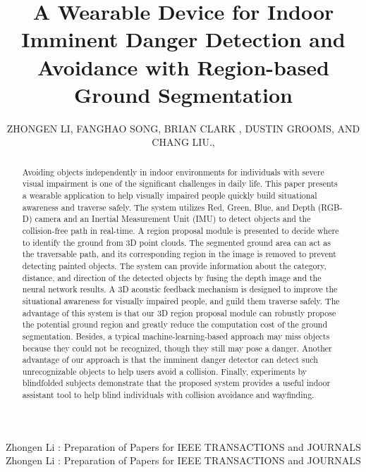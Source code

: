 \documentclass{ieeeaccess}
\begin{document}


\title{A Wearable Device for Indoor Imminent Danger Detection and Avoidance with Region-based Ground Segmentation}
\author{\uppercase{Zhongen Li}, 
\uppercase{Fanghao Song, 
Brian Clark  , 
Dustin Grooms, and Chang Liu}.,
}
\address[1]{School of Electrical and Computer Engineering, Ohio University, Athens, OH 45701 USA}
\address[2]{Ohio Musculoskeletal and Neurological Institute, Ohio University, Athens, OH 45701 USA}
\address[3]{Department of Biomedical Sciences, Ohio University, Athens, OH 45701 USA}
\address[4]{College of Health Sciences and Professions, Ohio University, Athens, OH 45701 USA}
\markboth
{Zhongen Li \headeretal: Preparation of Papers for IEEE TRANSACTIONS and JOURNALS}
{Zhongen Li \headeretal: Preparation of Papers for IEEE TRANSACTIONS and JOURNALS}

\begin{abstract}
Avoiding objects independently in indoor environments for individuals with severe visual impairment is one of the significant challenges in daily life. This paper presents a wearable application to help visually impaired people quickly build situational awareness and traverse safely. The system utilizes Red, Green, Blue, and Depth (RGB-D) camera and an Inertial Measurement Unit (IMU) to detect objects and the collision-free path in real-time. A region proposal module is presented to decide where to identify the ground from 3D point clouds. The segmented ground area can act as the traversable path, and its corresponding region in the image is removed to prevent detecting painted objects. The system can provide information about the category, distance, and direction of the detected objects by fusing the depth image and the neural network results. A 3D acoustic feedback mechanism is designed to improve the situational awareness for visually impaired people, and guild them traverse safely. The advantage of this system is that our 3D region proposal module can robustly propose the potential ground region and greatly reduce the computation cost of the ground segmentation. Besides, a typical machine-learning-based approach may miss objects because they could not be recognized, though they still may pose a danger. Another advantage of our approach is that the imminent danger detector can detect such unrecognizable objects to help users avoid a collision. Finally, experiments by blindfolded subjects demonstrate that the proposed system provides a useful indoor assistant tool to help blind individuals with collision avoidance and wayfinding.





\end{abstract}
\end{document}
